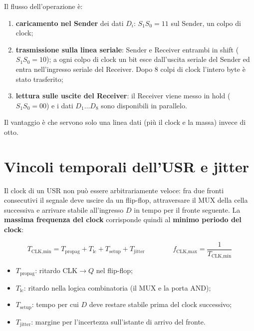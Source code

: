 \noindent Il flusso dell'operazione è:
\begin{enumerate}[leftmargin=1.8em, itemsep=2pt]
    \item \textbf{caricamento nel Sender} dei dati $D_i$: $S_1S_0=11$ sul Sender, un colpo di
          clock;
    \item \textbf{trasmissione sulla linea seriale}: Sender e Receiver entrambi in shift
          ($S_1S_0=10$); a ogni colpo di clock un bit esce dall'uscita seriale del Sender ed
          entra nell'ingresso seriale del Receiver. Dopo 8 colpi di clock l'intero byte è
          stato trasferito;
    \item \textbf{lettura sulle uscite del Receiver}: il Receiver viene messo in hold
          ($S_1S_0=00$) e i dati $D_1\ldots D_8$ sono disponibili in parallelo.
\end{enumerate}
Il vantaggio è che servono solo una linea dati (più il clock e la massa) invece di otto.

\section{Vincoli temporali dell'USR e jitter}

Il clock di un USR non può essere arbitrariamente veloce: fra due fronti consecutivi il
segnale deve uscire da un flip-flop, attraversare il MUX della cella successiva e arrivare
stabile all'ingresso $D$ in tempo per il fronte seguente. La \textbf{massima frequenza del
clock} corrisponde quindi al \textbf{minimo periodo del clock}:

\[
\boxed{T_{\text{CLK,min}} = T_{\text{propag}} + T_{\text{lc}} + T_{\text{setup}} + T_{\text{jitter}}}
\qquad\qquad f_{\text{CLK,max}} = \frac{1}{T_{\text{CLK,min}}}
\]

\begin{itemize}[leftmargin=1.5em, itemsep=1pt]
    \item $T_{\text{propag}}$: ritardo CLK$\to Q$ nel flip-flop;
    \item $T_{\text{lc}}$: ritardo nella logica combinatoria (il MUX e la porta AND);
    \item $T_{\text{setup}}$: tempo per cui $D$ deve restare stabile prima del clock
          successivo;
    \item $T_{\text{jitter}}$: margine per l'incertezza sull'istante di arrivo del fronte.
\end{itemize}

